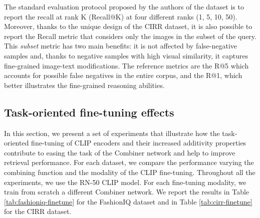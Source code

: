 \documentclass[acmlarge]{acmart}
\begin{document}
The standard evaluation protocol proposed by the authors of the dataset is to report the recall at rank K (Recall@K) at four different ranks (1, 5, 10, 50). Moreover, thanks to the unique design of the CIRR dataset, it is also possible to report the Recall metric that considers only the images in the subset of the query. This \emph{subset} metric has two main benefits: it is not affected by false-negative samples and, thanks to negative samples with high visual similarity, it captures fine-grained image-text modifications.
The reference metrics are the R@5 which accounts for possible false negatives in the entire corpus, and the R@1, which better illustrates the fine-grained reasoning abilities.



\subsection{Task-oriented fine-tuning effects} \label{sec:fine-tuning}
In this section, we present a set of experiments that illustrate how the task-oriented fine-tuning of CLIP encoders and their increased additivity properties contribute to easing the task of the Combiner network and help to improve retrieval performance.
For each dataset, we compare the performance varying the combining function and the modality of the CLIP fine-tuning.
Throughout all the experiments, we use the RN-50 CLIP model. For each fine-tuning modality, we train from scratch a different Combiner network.
We report the results in Table \ref{tab:fashioniq-finetune} for the FashionIQ dataset and in Table \ref{tab:cirr-finetune} for the CIRR dataset. 
\end{document}
